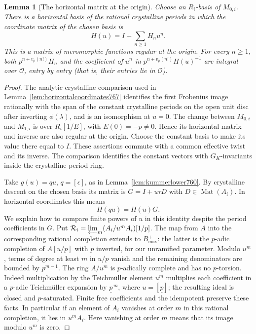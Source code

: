 \documentclass[a4paper,11pt]{article}
\newtheorem{lemma}[proposition]{Lemma}
\theoremstyle{definition}
\theoremstyle{remark}
\numberwithin{equation}{section}
\begin{document}
\begin{lemma}[The horizontal matrix at the origin]
\leavevmode\label{lem:originradius774}
Choose an \(R_i\)-basis of \(M_{0,i}\). There is a horizontal
basis of the rational crystalline periods in which the
coordinate matrix of the chosen basis is
\[
           H(u)=I+\sum_{n\ge1}H_n u^n .
\]
This is a matrix of meromorphic functions regular at the
origin. For every \(n\ge1\), both \(p^{n+v_p(n!)}H_n\) and
the coefficient of \(u^n\) in \(p^{n+v_p(n!)}H(u)^{-1}\)
are integral over \(\mathcal O\), entry by entry (that is,
their entries lie in \(\mathcal O\)).
\end{lemma}
\begin{proof}
The analytic crystalline comparison used in
Lemma~\ref{lem:horizontalcoordinates767} identifies the
first Frobenius image rationally with the span of the
constant crystalline periods on the open unit disc after
inverting \(\phi(\lambda)\), and is an isomorphism at \(u=0\).
The change between \(M_{0,i}\) and \(M_{1,i}\) is over
\(R_i[1/E]\), with \(E(0)=-p\ne0\). Hence its horizontal
matrix and inverse are also regular at the origin. Choose
the constant basis to make its value there equal to \(I\).
These assertions commute with a common effective twist and
its inverse. The comparison identifies the constant vectors
with \(G_K\)-invariants inside the crystalline period ring.
~\cite[(2.1.7)--(2.1.9) and Proposition~2.1.10]{III-II-bartlettcrys767}

Take \(g(u)=q u\), \(q=[\epsilon]\), as in
Lemma~\ref{lem:kummerlower760}. By crystalline descent on
the chosen basis its matrix is \(G=I+u\tau D\) with
\(D\in\operatorname{Mat}(A_i)\). In horizontal coordinates
this means
\[
                         H(qu)=H(u)G.
\]
We explain how to compare finite powers of \(u\) in this
identity despite the period coefficients in \(G\).
Put \(\mathcal R_i=\varprojlim_m(A_i/u^m A_i)[1/p]\).
The map from \(A\) into the corresponding rational
completion extends to \(B_{\max}^+\): the latter is the
\(p\)-adic completion of \(A[u/p]\) with \(p\) inverted,
for our unramified parameter. Modulo \(u^m\), terms of
degree at least \(m\) in \(u/p\) vanish and the remaining
denominators are bounded by \(p^{m-1}\). The ring \(A/u^m\)
is \(p\)-adically complete and has no \(p\)-torsion. Indeed
multiplication by the Teichm\"uller element \(u^m\) multiplies
each coefficient in a \(p\)-adic Teichm\"uller expansion
by \(\underline p^{\,m}\), where \(u=[\underline p]\);
the resulting ideal is closed and \(p\)-saturated.
Finite free coefficients and the idempotent preserve these
facts. In particular if an element of \(A_i\) vanishes at
order \(m\) in this rational completion, it lies in
\(u^m A_i\). Here vanishing at order \(m\) means that its
image modulo \(u^m\) is zero.


\end{proof}
\end{document}
